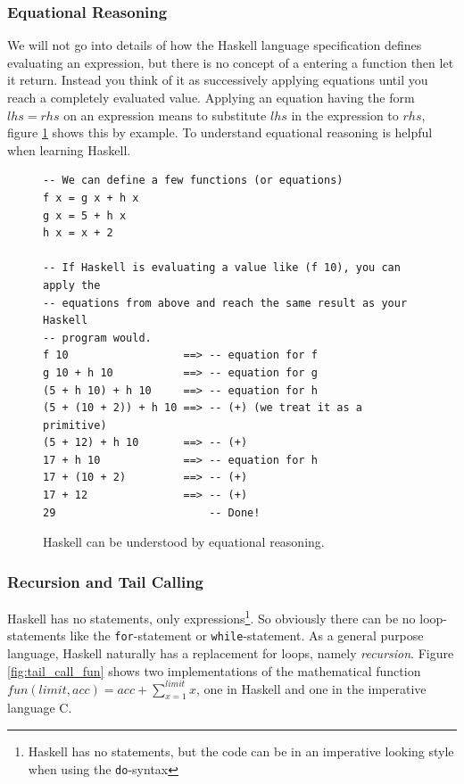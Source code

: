 \subsubsection{Equational Reasoning}

We will not go into details of how the Haskell language specification
defines evaluating an expression, but there is no concept of a
entering a function then let it return. Instead you think of it
as successively applying equations until you reach a completely
evaluated value. Applying an equation having the form $lhs = rhs$ on an
expression means to substitute $lhs$ in the expression to $rhs$, figure
\ref{fig:equational_reasioning} shows this by example.
To understand equational reasoning is helpful when learning Haskell.

\begin{figure}
\begin{mdframed}
  \begin{verbatim}
-- We can define a few functions (or equations)
f x = g x + h x
g x = 5 + h x
h x = x + 2

-- If Haskell is evaluating a value like (f 10), you can apply the
-- equations from above and reach the same result as your Haskell
-- program would.
f 10                  ==> -- equation for f
g 10 + h 10           ==> -- equation for g
(5 + h 10) + h 10     ==> -- equation for h
(5 + (10 + 2)) + h 10 ==> -- (+) (we treat it as a primitive)
(5 + 12) + h 10       ==> -- (+)
17 + h 10             ==> -- equation for h
17 + (10 + 2)         ==> -- (+)
17 + 12               ==> -- (+)
29                        -- Done!
  \end{verbatim}
  \caption{Haskell can be understood by equational reasoning.}
  \label{fig:equational_reasioning}
\end{mdframed}
\end{figure}

\subsubsection{Recursion and Tail Calling}

Haskell has no statements, only expressions\footnote{Haskell has no statements,
  but the code can be in an imperative looking style when using the
  \texttt{do}-syntax}. So obviously there
can be no loop-statements like the \texttt{for}-statement or
\texttt{while}-statement. As a general purpose language,
Haskell naturally has a replacement for loops, namely \emph{recursion}. Figure
\ref{fig:tail_call_fun} shows two implementations of the mathematical
function $ fun(limit, acc) = acc + \sum_{x=1}^{limit}{x} $, one in
Haskell and one in the imperative language C.

